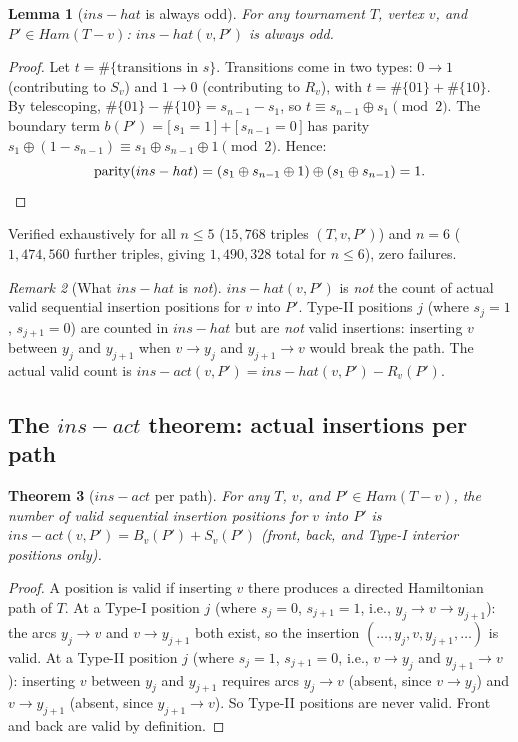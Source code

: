 \documentclass[12pt,reqno]{amsart}
\theoremstyle{plain}
\newtheorem{theorem}{Theorem}[section]
\newtheorem{lemma}[theorem]{Lemma}
\theoremstyle{definition}
\theoremstyle{remark}
\newtheorem{remark}[theorem]{Remark}
\newcommand{\Ham}{\mathrm{Ham}}
\newcommand{\iverson}[1]{\bigl[\,#1\,\bigr]}
\newcommand{\inshat}{\widehat{\mathrm{ins}}}
\newcommand{\insact}{\mathrm{ins}_{\mathrm{act}}}
\renewcommand{\Ham}{Ham}%
\renewcommand{\inshat}{ins-hat}%
\renewcommand{\insact}{ins-act}%
\begin{document}
\begin{lemma}[$\inshat$ is always odd]\label{lem:ins_odd}
For any tournament $T$, vertex $v$, and $P' \in \Ham(T{-}v)$: $\inshat(v,P')$
is always odd.
\end{lemma}
\begin{proof}
Let $t = \#\{\text{transitions in }s\}$. Transitions come in two types:
$0{\to}1$ (contributing to $S_v$) and $1{\to}0$ (contributing to $R_v$),
with $t = \#\{01\} + \#\{10\}$. By telescoping, $\#\{01\} - \#\{10\} =
s_{n-1} - s_1$, so $t \equiv s_{n-1} \oplus s_1 \pmod{2}$. The boundary term
$b(P') = \iverson{s_1=1} + \iverson{s_{n-1}=0}$ has parity
$s_1 \oplus (1 - s_{n-1}) \equiv s_1 \oplus s_{n-1} \oplus 1 \pmod{2}$.
Hence:
\[
  \mathrm{parity}(\inshat) = (s_1 \oplus s_{n-1} \oplus 1) \oplus (s_1 \oplus s_{n-1}) = 1.
  \qedhere
\]
\end{proof}

\noindent Verified exhaustively for all $n \leq 5$ ($15{,}768$ triples $(T,v,P')$)
and $n=6$ ($1{,}474{,}560$ further triples, giving $1{,}490{,}328$ total for $n \leq 6$),
zero failures.

\begin{remark}[What $\inshat$ is \emph{not}]
$\inshat(v,P')$ is \emph{not} the count of actual valid sequential insertion
positions for $v$ into $P'$. Type-II positions $j$ (where $s_j = 1$, $s_{j+1}=0$)
are counted in $\inshat$ but are \emph{not} valid insertions: inserting $v$
between $y_j$ and $y_{j+1}$ when $v \to y_j$ and $y_{j+1} \to v$ would break
the path. The actual valid count is $\insact(v,P') = \inshat(v,P') - R_v(P')$.
\end{remark}

\subsection{The $\insact$ theorem: actual insertions per path}
\label{subsec:insact}

\begin{theorem}[$\insact$ per path]\label{thm:insact}
For any $T$, $v$, and $P' \in \Ham(T{-}v)$, the number of valid sequential
insertion positions for $v$ into $P'$ is $\insact(v, P') = B_v(P') + S_v(P')$
(front, back, and Type-I interior positions only).
\end{theorem}
\begin{proof}
A position is valid if inserting $v$ there produces a directed Hamiltonian path
of $T$. At a Type-I position $j$ (where $s_j = 0$, $s_{j+1} = 1$, i.e.,
$y_j \to v \to y_{j+1}$): the arcs $y_j \to v$ and $v \to y_{j+1}$ both exist,
so the insertion $(\ldots, y_j, v, y_{j+1}, \ldots)$ is valid. At a Type-II
position $j$ (where $s_j = 1$, $s_{j+1} = 0$, i.e., $v \to y_j$ and
$y_{j+1} \to v$): inserting $v$ between $y_j$ and $y_{j+1}$ requires arcs
$y_j \to v$ (absent, since $v \to y_j$) and $v \to y_{j+1}$ (absent, since
$y_{j+1} \to v$). So Type-II positions are never valid. Front and back are
valid by definition.
\end{proof}
\end{document}
